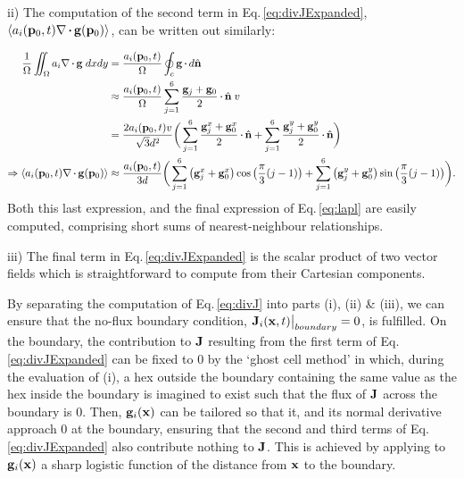 \documentclass[9pt,lineno]{elife}
\begin{document}
ii) The computation of the second term in Eq.\,\ref{eq:divJExpanded},
$\langle a_i(\mb{p}_0,t)\nabla\vcdot\mb{g}(\mb{p}_0)\rangle$, can be written out similarly:

\begin{equation} \label{eq:divg}
\begin{split}
%
\frac{1}{\Omega} \iint_\Omega a_i\nabla\vcdot\mb{g}\;dxdy & = \frac{a_i(\mb{p}_0,t)}{\Omega}  \oint_c \mb{g}\vcdot d\hat{\mathbf{n}} \\
%
& \approx \frac{a_i(\mb{p}_0,t)}{\Omega} \sum_{j=1}^{6} \frac{\mb{g}_j + \mb{g}_0}{2}\vcdot \hat{\mb{n}}\;v \\
%
& = \frac{2 a_i(\mb{p}_0,t)v}{\sqrt{3}d^2} \bigg( \sum_{j=1}^{6} \frac{\mb{g}_j^x + \mb{g}_0^x}{2} \vcdot  \hat{\mb{n}} + \sum_{j=1}^{6} \frac{\mb{g}_j^y + \mb{g}_0^y}{2} \vcdot  \hat{\mb{n}} \bigg) \\
%
%
\Rightarrow \langle a_i(\mb{p}_0,t)\nabla\vcdot\mb{g}(\mb{p}_0)\rangle & \approx \frac{a_i(\mb{p}_0,t)}{3d} \bigg( \sum_{j=1}^{6} \big(\mb{g}_j^x + \mb{g}_0^x\big) \cos \big(\frac{\pi}{3}(j-1)\big) + \sum_{j=1}^{6} \big({\mb{g}_j^y + \mb{g}_0^y}\big) \sin \big(\frac{\pi}{3}(j-1)\big) \bigg). \\
%
\end{split}
\end{equation}
%
Both this last expression, and the final expression of Eq.\,\ref{eq:lapl} are
easily computed, comprising short sums of nearest-neighbour relationships.

iii) The final term in Eq.\,\ref{eq:divJExpanded} is the scalar product of two
vector fields which is straightforward to compute from their Cartesian
components.

By separating the computation of Eq.\,\ref{eq:divJ} into parts (i), (ii) \&
(iii), we can ensure that the no-flux boundary condition,
$\mathbf{J}_i(\mathbf{x},t)\big\rvert_{boundary} = 0$, is fulfilled. On the boundary,
the contribution to $\mathbf{J}$ resulting from the first term of
Eq.\,\ref{eq:divJExpanded} can be fixed to 0 by the `ghost cell method' in
which, during the evaluation of (i), a hex outside the boundary containing the
same value as the hex inside the boundary is imagined to exist such that the
flux of $\mathbf{J}$ across the boundary is 0. Then, $\mathbf{g}_i(\mathbf{x})$ can be
tailored so that it, and its normal derivative approach 0 at the boundary,
ensuring that the second and third terms of Eq.\,\ref{eq:divJExpanded} also
contribute nothing to $\mathbf{J}$. This is achieved by applying to
$\mathbf{g}_i(\mathbf{x})$ a sharp logistic function of the distance from $\mathbf{x}$ to
the boundary.
\end{document}
